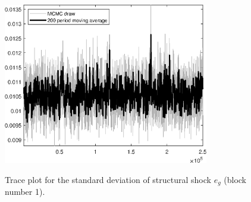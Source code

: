 \begin{figure}[H]
\centering
  \includegraphics[width=0.8\textwidth]{BRS_imp_mobility_alt/graphs/TracePlot_SE_e_g_blck_1}\\
    \caption{Trace plot for the standard deviation of structural shock ${e_g}$ (block number 1).}
\end{figure}
